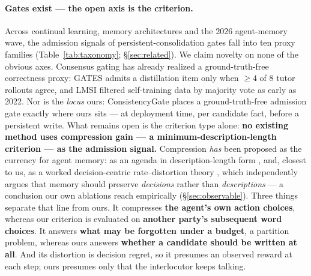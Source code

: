\documentclass[11pt]{article}
\begin{document}
\paragraph{Gates exist --- the open axis is the criterion.}
Across continual learning, memory architectures and the 2026 agent-memory wave, the
admission signals of persistent-consolidation gates fall into ten proxy families
(Table~\ref{tab:taxonomy}; \S\ref{sec:related}). We claim novelty on none of the obvious axes. Consensus gating
has already realized a ground-truth-free correctness proxy: GATES \citep{stein2026gates}
admits a distillation item only when $\geq 4$ of $8$ tutor rollouts agree, and LMSI
\citep{huang2022selfimprove} filtered self-training data by majority vote as early as 2022.
Nor is the \emph{locus} ours: ConsistencyGate \citep{zhang2026consistencygate} places a
ground-truth-free admission gate exactly where ours sits --- at deployment time, per
candidate fact, before a persistent write. What remains open is the criterion type alone:
\textbf{no existing method uses compression gain --- a minimum-description-length criterion
--- as the admission signal.} Compression \emph{has} been proposed as the currency for
agent memory: as an agenda in description-length form \citep{colaco2026ratedistortion},
and, closest to us, as a worked decision-centric rate--distortion theory
\citep{zou2026demem}, which independently argues that memory should preserve
\emph{decisions} rather than \emph{descriptions} --- a conclusion our own ablations reach
empirically (\S\ref{sec:observable}). Three things separate that line from ours. It
compresses \textbf{the agent's own action choices}, whereas our criterion is evaluated on
\textbf{another party's subsequent word choices}. It answers \textbf{what may be forgotten
under a budget}, a partition problem, whereas ours answers \textbf{whether a candidate
should be written at all}. And its distortion is decision regret, so it presumes an
observed reward at each step; ours presumes only that the interlocutor keeps talking.
\end{document}
